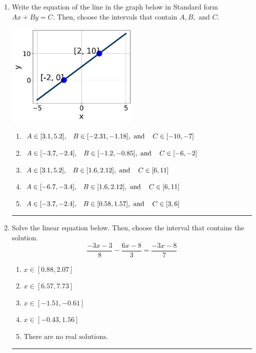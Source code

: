 \documentclass[14pt]{extbook}
\newcommand{\litem}[1]{\item#1\hspace*{-1cm}\rule{\textwidth}{0.4pt}}
\begin{document}
\begin{enumerate}
\litem{
Write the equation of the line in the graph below in Standard form $Ax+By=C$. Then, choose the intervals that contain $A, B, \text{ and } C$.
\begin{center}
    \includegraphics[width=0.5\textwidth]{../Figures/linearGraphToStandardCopyB.png}
\end{center}
\begin{enumerate}[label=\Alph*.]
\item \( A \in [3.1, 5.2], \hspace{3mm} B \in [-2.31, -1.18], \text{ and } \hspace{3mm} C \in [-10, -7] \)
\item \( A \in [-3.7, -2.4], \hspace{3mm} B \in [-1.2, -0.85], \text{ and } \hspace{3mm} C \in [-6, -2] \)
\item \( A \in [3.1, 5.2], \hspace{3mm} B \in [1.6, 2.12], \text{ and } \hspace{3mm} C \in [6, 11] \)
\item \( A \in [-6.7, -3.4], \hspace{3mm} B \in [1.6, 2.12], \text{ and } \hspace{3mm} C \in [6, 11] \)
\item \( A \in [-3.7, -2.4], \hspace{3mm} B \in [0.58, 1.57], \text{ and } \hspace{3mm} C \in [3, 6] \)

\end{enumerate} }
\litem{
Solve the linear equation below. Then, choose the interval that contains the solution.\[ \frac{-3x -3}{8} - \frac{6x -8}{3} = \frac{-3x -8}{7} \]\begin{enumerate}[label=\Alph*.]
\item \( x \in [0.88, 2.07] \)
\item \( x \in [6.57, 7.73] \)
\item \( x \in [-1.51, -0.61] \)
\item \( x \in [-0.43, 1.56] \)
\item \( \text{There are no real solutions.} \)


\end{enumerate}}
\end{enumerate}
\end{document}
